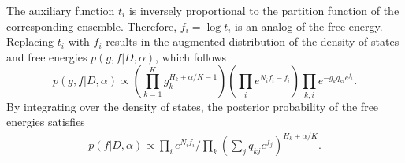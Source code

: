 The auxiliary function $t_i$ is inversely proportional to the partition function of the corresponding ensemble. Therefore, $f_i=\log t_i$ is an analog of the free energy. Replacing $t_i$ with $f_i$ results in the augmented distribution of the density of states and free energies $p(g,f|D,\alpha)$, which follows
\begin{equation}
    p(g,f|D,\alpha)\propto \left(\prod_{k=1}^Kg_k^{H_k+\alpha/K-1}\right)\left(\prod_i e^{N_if_i-f_i}\right)\prod_{k,i}e^{-g_kq_{ki}e^{f_i}}.
\end{equation}
By integrating over the density of states, the posterior probability of the free energies satisfies
\begin{align}
    p(f|D,\alpha)\propto \prod_i e^{N_if_i}/\prod_k\left(\sum_j q_{kj}e^{f_j}\right)^{H_k+\alpha/K}.
\end{align}







